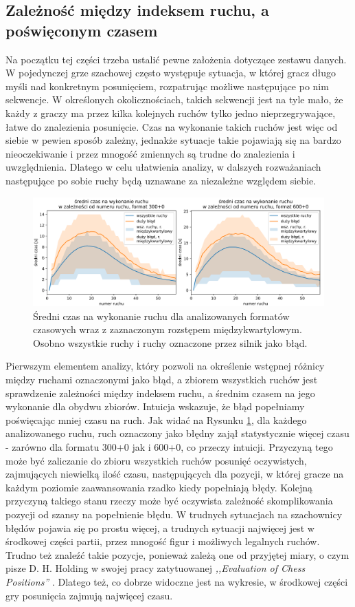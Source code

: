 \documentclass[inzynierska]{pwr_wmat_praca_dyplomowa}
\theoremstyle{plain}
\numberwithin{theorem}{chapter}
\theoremstyle{definition}
\numberwithin{theorem}{chapter}
\begin{document}
\subsection{Zależność między indeksem ruchu, a poświęconym czasem}


Na początku tej części trzeba ustalić pewne założenia dotyczące zestawu danych. W pojedynczej grze szachowej często występuje sytuacja, w której gracz długo myśli nad konkretnym posunięciem, rozpatrując możliwe następujące po nim sekwencje. W określonych okolicznościach, takich sekwencji jest na tyle mało, że każdy z graczy ma przez kilka kolejnych ruchów tylko jedno nieprzegrywające, łatwe do znalezienia posunięcie. Czas na wykonanie takich ruchów jest więc od siebie w pewien sposób zależny, jednakże sytuacje takie pojawiają się na bardzo nieoczekiwanie i przez mnogość zmiennych są trudne do znalezienia i uwzględnienia. Dlatego w celu ułatwienia analizy, w dalszych rozważaniach następujące po sobie ruchy będą uznawane za niezależne względem siebie.
\begin{figure}[H]
	\centering
	\includegraphics[width=\textwidth]{sr_czas_na_ruch.png}
	\caption{Średni czas na wykonanie ruchu dla analizowanych formatów czasowych wraz z zaznaczonym rozstępem międzykwartylowym. Osobno wszystkie ruchy i ruchy oznaczone przez silnik jako błąd.}
	\label{rys:sr_czas_na_ruch}
\end{figure}

Pierwszym elementem analizy, który pozwoli na określenie wstępnej różnicy między ruchami oznaczonymi jako błąd, a zbiorem wszystkich ruchów jest sprawdzenie zależności między indeksem ruchu, a średnim czasem na jego wykonanie dla obydwu zbiorów. Intuicja wskazuje, że błąd popełniamy poświęcając mniej czasu na ruch. Jak widać na Rysunku \ref{rys:sr_czas_na_ruch}, dla każdego analizowanego ruchu, ruch oznaczony jako błędny zajął statystycznie więcej czasu - zarówno dla formatu 300+0 jak i 600+0, co przeczy intuicji. 
Przyczyną tego może być zaliczanie do zbioru wszystkich ruchów posunięć oczywistych, zajmujących niewielką ilość czasu, następujących dla pozycji, w której gracze na każdym poziomie zaawansowania rzadko kiedy popełniają błędy.
Kolejną przyczyną takiego stanu rzeczy może być oczywista zależność skomplikowania pozycji od szansy na popełnienie błędu. W trudnych sytuacjach na szachownicy błędów pojawia się po prostu więcej, a trudnych sytuacji najwięcej jest w środkowej części partii, przez mnogość figur i możliwych legalnych ruchów. Trudno też znaleźć takie pozycje, ponieważ zależą one od przyjętej miary, o czym pisze D. H. Holding w swojej pracy zatytuowanej \textit{,,Evaluation of Chess Positions''} \cite{Holding1979TheEO}.  Dlatego też, co dobrze widoczne jest na wykresie, w środkowej części gry posunięcia zajmują najwięcej czasu.
\end{document}
